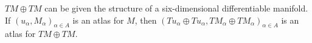 $TM \oplus TM$ can be given the structure of a six-dimensional differentiable manifold. If $(u_\alpha, M_\alpha)_{\alpha \in A}$ is an atlas for $M$, then $(Tu_\alpha \oplus Tu_\alpha, TM_\alpha \oplus TM_\alpha)_{\alpha \in A}$ is an atlas for $TM \oplus TM$.